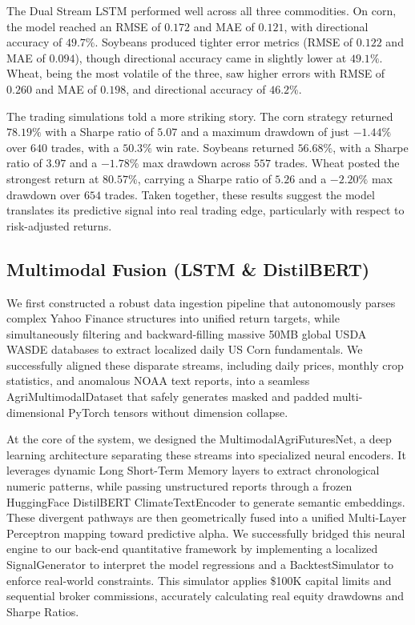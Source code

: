 \documentclass{article} %
\begin{document}
The Dual Stream LSTM performed well across all three commodities. On corn, the
model reached an RMSE of $0.172$ and MAE of $0.121$, with directional accuracy
of $49.7\%$. Soybeans produced tighter error metrics (RMSE of $0.122$ and MAE
of $0.094$), though directional accuracy came in slightly lower at $49.1\%$.
Wheat, being the most volatile of the three, saw higher errors with RMSE of
$0.260$ and MAE of $0.198$, and directional accuracy of $46.2\%$.

The trading simulations told a more striking story. The corn strategy returned
$78.19\%$ with a Sharpe ratio of $5.07$ and a maximum drawdown of just
$-1.44\%$ over $640$ trades, with a $50.3\%$ win rate. Soybeans returned
$56.68\%$, with a Sharpe ratio of $3.97$ and a $-1.78\%$ max drawdown across
$557$ trades. Wheat posted the strongest return at $80.57\%$, carrying a Sharpe
ratio of $5.26$ and a $-2.20\%$ max drawdown over $654$ trades. Taken together,
these results suggest the model translates its predictive signal into real
trading edge, particularly with respect to risk-adjusted returns.

\subsection{Multimodal Fusion (LSTM \& DistilBERT)}
We first constructed a robust data ingestion pipeline that autonomously parses complex Yahoo Finance structures into unified return targets, while simultaneously filtering and backward-filling massive 50MB global USDA WASDE databases to extract localized daily US Corn fundamentals. We successfully aligned these disparate streams, including daily prices, monthly crop statistics, and anomalous NOAA text reports, into a seamless AgriMultimodalDataset that safely generates masked and padded multi-dimensional PyTorch tensors without dimension collapse.

At the core of the system, we designed the MultimodalAgriFuturesNet, a deep learning architecture separating these streams into specialized neural encoders. It leverages dynamic Long Short-Term Memory layers to extract chronological numeric patterns, while passing unstructured reports through a frozen HuggingFace DistilBERT ClimateTextEncoder to generate semantic embeddings. These divergent pathways are then geometrically fused into a unified Multi-Layer Perceptron mapping toward predictive alpha. We successfully bridged this neural engine to our back-end quantitative framework by implementing a localized SignalGenerator to interpret the model regressions and a BacktestSimulator to enforce real-world constraints. This simulator applies \$100K capital limits and sequential broker commissions, accurately calculating real equity drawdowns and Sharpe Ratios.
\end{document}
